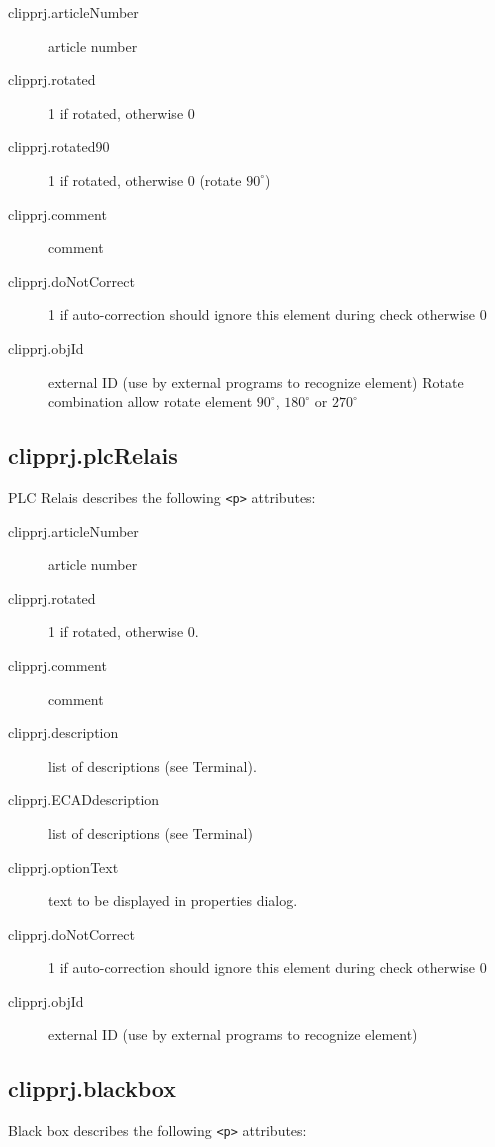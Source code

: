 \documentclass[%
	a4paper,
	oneside,
	listof=numbered,
	parskip=half,
	headsepline=true,
	footsepline=true,
	]{scrbook}
\begin{document}
\begin{description}
	\item[clipprj.articleNumber] article number
	\item[clipprj.rotated] 1 if rotated, otherwise 0
	\item[clipprj.rotated90] 1 if rotated, otherwise 0 (rotate $90^\circ$) 
	\item[clipprj.comment] comment
	\item[clipprj.doNotCorrect] 1 if auto-correction should ignore this element during check otherwise 0
	\item[clipprj.objId] external ID (use by external programs to recognize element) Rotate combination allow rotate element $90^\circ$, $180^\circ$ or $270^\circ$
\end{description}

\subsection{clipprj.plcRelais}
 
PLC Relais describes the following \verb|<p>| attributes: 

\begin{description}
	\item[clipprj.articleNumber] article number 
	\item[clipprj.rotated] 1 if rotated, otherwise 0. 
	\item[clipprj.comment] comment 
	\item[clipprj.description] list of descriptions (see Terminal). 
	\item[clipprj.ECADdescription] list of descriptions (see Terminal) 
	\item[clipprj.optionText] text to be displayed in properties dialog. 
	\item[clipprj.doNotCorrect] 1 if auto-correction should ignore this element during check otherwise 0 
	\item[clipprj.objId] external ID (use by external programs to recognize element)
\end{description}

\subsection{clipprj.blackbox}
 
Black box describes the following \verb|<p>| attributes: 
\end{document}

